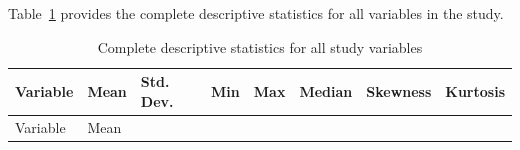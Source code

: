 \documentclass[
  letterpaper,
  oneside,
  openany]{MastersDoctoralThesis}
\begin{document}
Table~\ref{tbl-app-b-full} provides the complete descriptive statistics
for all variables in the study.

\begin{longtable}[]{@{}
  >{\raggedright\arraybackslash}p{}
  >{\raggedright\arraybackslash}p{}
  >{\raggedright\arraybackslash}p{}
  >{\raggedright\arraybackslash}p{}
  >{\raggedright\arraybackslash}p{}
  >{\raggedright\arraybackslash}p{}
  >{\raggedright\arraybackslash}p{}
  >{\raggedright\arraybackslash}p{}@{}}
\caption{Complete descriptive statistics for all study
variables}\label{tbl-app-b-full}\tabularnewline
\toprule\noalign{}
\begin{minipage}[b]{\linewidth}\raggedright
Variable
\end{minipage} & \begin{minipage}[b]{\linewidth}\raggedright
Mean
\end{minipage} & \begin{minipage}[b]{\linewidth}\raggedright
Std. Dev.
\end{minipage} & \begin{minipage}[b]{\linewidth}\raggedright
Min
\end{minipage} & \begin{minipage}[b]{\linewidth}\raggedright
Max
\end{minipage} & \begin{minipage}[b]{\linewidth}\raggedright
Median
\end{minipage} & \begin{minipage}[b]{\linewidth}\raggedright
Skewness
\end{minipage} & \begin{minipage}[b]{\linewidth}\raggedright
Kurtosis
\end{minipage} \\
\midrule\noalign{}
\endfirsthead
\toprule\noalign{}
\begin{minipage}[b]{\linewidth}\raggedright
Variable
\end{minipage} & \begin{minipage}[b]{\linewidth}\raggedright
Mean
\end{minipage} & \begin{minipage}[b]{\linewidth}\raggedright

\end{minipage}
\end{longtable}
\end{document}
